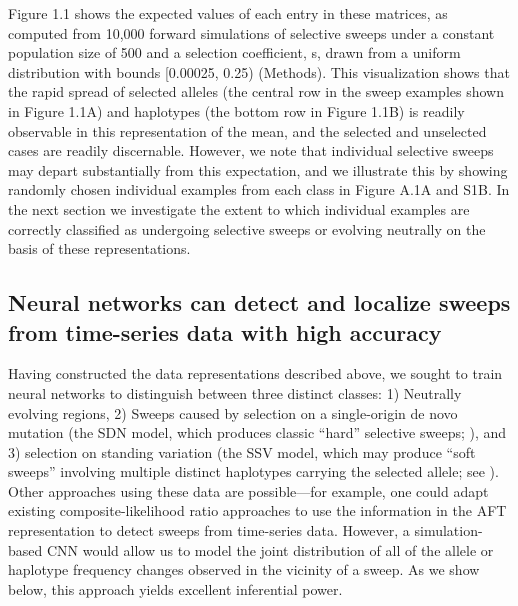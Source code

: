 Figure 1.1 shows the expected values of each entry in these matrices, as computed from 10,000 forward simulations of selective sweeps under a constant population size of 500 and a selection coefficient, s, drawn from a uniform distribution with bounds [0.00025, 0.25) (Methods). This visualization shows that the rapid spread of selected alleles (the central row in the sweep examples shown in Figure 1.1A) and haplotypes (the bottom row in Figure 1.1B) is readily observable in this representation of the mean, and the selected and unselected cases are readily discernable. However, we note that individual selective sweeps may depart substantially from this expectation, and we illustrate this by showing randomly chosen individual examples from each class in Figure A.1A and S1B. In the next section we investigate the extent to which individual examples are correctly classified as undergoing selective sweeps or evolving neutrally on the basis of these representations. \\

\subsection{Neural networks can detect and localize sweeps from time-series data with high accuracy}

Having constructed the data representations described above, we sought to train neural networks to distinguish between three distinct classes: 1) Neutrally evolving regions, 2) Sweeps caused by selection on a single-origin de novo mutation (the SDN model, which produces classic “hard” selective sweeps; \cite{smithHitchhikingEffectFavourable1974}), and 3) selection on standing variation (the SSV model, which may produce “soft sweeps” involving multiple distinct haplotypes carrying the selected allele; see \cite{hermissonSoftSweepsMolecular2005,orrHaldaneSieveAdaptation2001}). Other approaches using these data are possible—for example, one could adapt existing composite-likelihood ratio approaches \cite{nielsenGenomicScansSelective2005,vyCompositeLikelihoodMethodDetecting2015} to use the information in the AFT representation to detect sweeps from time-series data. However, a simulation-based CNN would allow us to model the joint distribution of all of the allele or haplotype frequency changes observed in the vicinity of a sweep. As we show below, this approach yields excellent inferential power. 

